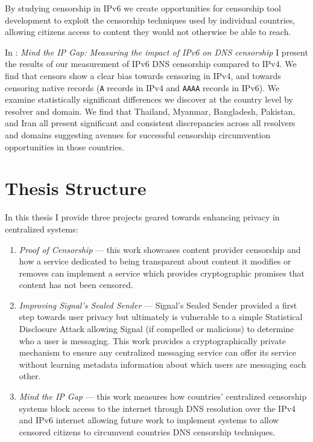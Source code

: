 By studying censorship in IPv6 we create opportunities for censorship tool
development to exploit the censorship techniques used by individual countries,
allowing citizens access to content they would not otherwise be able to reach.

In : \emph{Mind the IP Gap: Measuring the impact of IPv6 on DNS
censorship} I present the results of our measurement of IPv6 DNS censorship
compared to IPv4. We find that censors show a clear bias towards censoring in
IPv4, and towards censoring native records (\texttt{A} records in IPv4 and
\texttt{AAAA} records in IPv6). We examine statistically significant differences
we discover at the country level by resolver and domain. We find that Thailand,
Myanmar, Bangladesh, Pakistan, and Iran all present significant and consistent
discrepancies across all resolvers and domains suggesting avenues for successful
censorship circumvention opportunities in those countries.

\section{Thesis Structure}
In this thesis I provide three projects geared towards enhancing privacy in
centralized systems:

\begin{enumerate}
    \item \emph{Proof of Censorship} --- this work showcases content provider
    censorship and how a service dedicated to being transparent about content it
    modifies or removes can implement a service which provides cryptographic
    promises that content has not been censored.
    \item \emph{Improving Signal's Sealed Sender} --- Signal's Sealed Sender
    provided a first step towards user privacy but ultimately is vulnerable to a
    simple Statistical Disclosure Attack allowing Signal (if compelled or
    malicious) to determine who a user is messaging. This work provides a
    cryptographically private mechanism to ensure any centralized messaging
    service can offer its service without learning metadata information about
    which users are messaging each other.
    \item \emph{Mind the IP Gap} --- this work measures how countries'
    centralized censorship systems block access to the internet through DNS
    resolution over the IPv4 and IPv6 internet allowing future work to implement
    systems to allow censored citizens to circumvent countries DNS censorship
    techniques.
\end{enumerate}